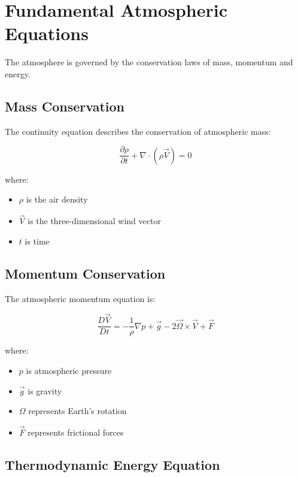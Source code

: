 \section{Fundamental Atmospheric Equations}

The atmosphere is governed by the conservation laws of mass,
momentum and energy.


\subsection{Mass Conservation}

The continuity equation describes the conservation of atmospheric mass:

\begin{equation}
\frac{\partial \rho}{\partial t}
+
\nabla \cdot (\rho \vec{V})
=
0
\end{equation}

where:

\begin{itemize}
\item $\rho$ is the air density
\item $\vec{V}$ is the three-dimensional wind vector
\item $t$ is time
\end{itemize}



\subsection{Momentum Conservation}

The atmospheric momentum equation is:

\begin{equation}
\frac{D\vec{V}}{Dt}
=
-\frac{1}{\rho}\nabla p
+
\vec{g}
-
2\vec{\Omega}\times\vec{V}
+
\vec{F}
\end{equation}


where:

\begin{itemize}
\item $p$ is atmospheric pressure
\item $\vec{g}$ is gravity
\item $\Omega$ represents Earth's rotation
\item $\vec{F}$ represents frictional forces
\end{itemize}



\subsection{Thermodynamic Energy Equation}

